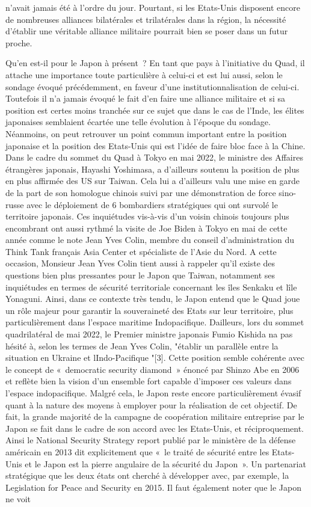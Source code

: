 \documentclass[11pt,a4paper]{article}
\begin{document}
n'avait jamais été à l'ordre du jour. Pourtant, si les Etats-Unis disposent encore de nombreuses alliances bilatérales et trilatérales dans la région, la nécessité d'établir une véritable alliance militaire pourrait bien se poser dans un futur proche.

Qu'en est-il pour le Japon à présent~? En tant que pays à l'initiative du Quad, il attache une importance toute particulière à celui-ci et est lui aussi, selon le sondage évoqué précédemment, en faveur d'une institutionnalisation de celui-ci. Toutefois il n'a jamais évoqué le fait d'en faire une alliance militaire et si sa position est certes moins tranchée sur ce sujet que dans le cas de l'Inde, les élites japonaises semblaient écartée une telle évolution à l'époque du sondage. Néanmoins, on peut retrouver un point commun important entre la position japonaise et la position des Etats-Unis qui est l'idée de faire bloc face à la Chine. Dans le cadre du sommet du Quad à Tokyo en mai 2022, le ministre des Affaires étrangères japonais, Hayashi Yoshimasa, a d'ailleurs soutenu la position de plus en plus affirmée des US sur Taiwan. Cela lui a d'ailleurs valu une mise en garde de la part de son homologue chinois suivi par une démonstration de force sino-russe avec le déploiement de 6 bombardiers stratégiques qui ont survolé le territoire japonais. Ces inquiétudes vis-à-vis d'un voisin chinois toujours plus encombrant ont aussi rythmé la visite de Joe Biden à Tokyo en mai de cette année comme le note Jean Yves Colin, membre du conseil d'administration du Think Tank français Asia Center et spécialiste de l'Asie du Nord. A cette occasion, Monsieur Jean Yves Colin tient aussi à rappeler qu'il existe des questions bien plus pressantes pour le Japon que Taiwan, notamment ses inquiétudes en termes de sécurité territoriale concernant les îles Senkaku et l\textquotesingle île Yonaguni. Ainsi, dans ce contexte très tendu, le Japon entend que le Quad joue un rôle majeur pour garantir la souveraineté des Etats sur leur territoire, plus particulièrement dans l'espace maritime Indopacifique. D\textquotesingle ailleurs, lors du sommet quadrilatéral de mai 2022, le Premier ministre japonais Fumio Kishida n\textquotesingle a pas hésité à, selon les termes de Jean Yves Colin, "établir un parallèle entre la situation en Ukraine et l\textquotesingle Indo-Pacifique "{[}3{]}. Cette position semble cohérente avec le concept de «~democratic security diamond~» énoncé par Shinzo Abe en 2006 et reflète bien la vision d'un ensemble fort capable d'imposer ces valeurs dans l'espace indopacifique. Malgré cela, le Japon reste encore particulièrement évasif quant à la nature des moyens à employer pour la réalisation de cet objectif. De fait, la grande majorité de la campagne de coopération militaire entreprise par le Japon se fait dans le cadre de son accord avec les Etats-Unis, et réciproquement. Ainsi le National Security Strategy report publié par le ministère de la défense américain en 2013 dit explicitement que «~le traité de sécurité entre les Etats-Unis et le Japon est la pierre angulaire de la sécurité du Japon~». Un partenariat stratégique que les deux états ont cherché à développer avec, par exemple, la Legislation for Peace and Security en 2015. Il faut également noter que le Japon ne voit 
\end{document}
